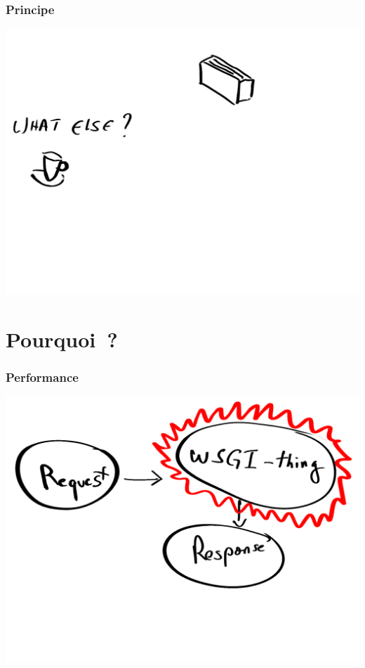 \documentclass[frenchb,francais]{beamer}
\begin{document}
\begin{frame}
    \frametitle{Principe}
    \begin{center}\includegraphics[scale=.20]{img/static-generation_3.png}\end{center}
\end{frame}

\section{Pourquoi ?}

\begin{frame}
    \frametitle{Performance}
    \begin{center}\includegraphics[scale=.17]{img/wsgi-flow.png}\end{center}
\end{frame}
\end{document}
